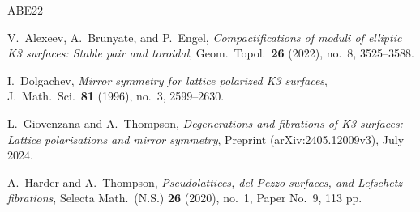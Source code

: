 \documentclass[11pt]{amsart}
\theoremstyle{definition}
\begin{document}
\begin{thebibliography}{ABE22}

V.~Alexeev, A.~Brunyate, and P.~Engel,
\emph{Compactifications of moduli of elliptic {K3} surfaces: Stable pair and toroidal},
Geom.\ Topol.\ \textbf{26} (2022), no.~8, 3525--3588.

I.~Dolgachev,
\emph{Mirror symmetry for lattice polarized {K3} surfaces},
J.\ Math.\ Sci.\ \textbf{81} (1996), no.~3, 2599--2630.

L.~Giovenzana and A.~Thompson,
\emph{Degenerations and fibrations of {K3} surfaces: Lattice polarisations and mirror symmetry},
Preprint (arXiv:2405.12009v3), July 2024.

A.~Harder and A.~Thompson,
\emph{Pseudolattices, del Pezzo surfaces, and Lefschetz fibrations},
Selecta Math.\ (N.S.) \textbf{26} (2020), no.~1, Paper No.~9, 113 pp.

\end{thebibliography}
\end{document}
